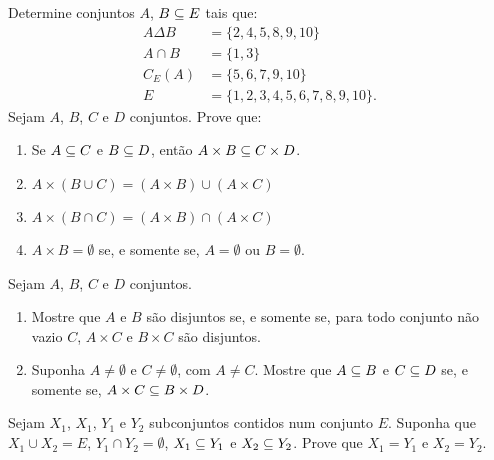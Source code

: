 \documentclass[12pt]{exam}
\begin{document}
\questao{} Determine conjuntos $A$, $B \subseteq E$ tais que:
\begin{align*}
	A \Delta B &= \{2, 4, 5, 8, 9, 10\}\\
	A \cap B &= \{1, 3\}\\
	C_E(A) &= \{5, 6, 7, 9, 10\}\\
	E &= \{1, 2, 3, 4, 5, 6, 7, 8, 9, 10\}.
\end{align*}
\questao{} Sejam $A$, $B$, $C$ e $D$ conjuntos. Prove que:
\begin{enumerate}[label={\alph*})]
	\item Se $A \subseteq C$ e $B \subseteq D$, ent\~ao $A \times B \subseteq C \times D$.
	\item $A \times (B \cup C) = (A \times B) \cup (A \times C)$
	\item $A \times (B \cap C) = (A \times B) \cap (A \times C)$
	\item $A \times B = \emptyset$ se, e somente se, $A = \emptyset$ ou $B = \emptyset$.
\end{enumerate}

\questao{} Sejam $A$, $B$, $C$ e $D$ conjuntos.
\begin{enumerate}[label={\alph*})]
	\item Mostre que $A$ e $B$ s\~ao disjuntos se, e somente se, para todo conjunto n\~ao vazio $C$, $A \times C$ e $B \times C$ s\~ao disjuntos.
	\item Suponha $A \ne \emptyset$ e $C \ne \emptyset$, com $A \ne C$. Mostre que $A \subseteq B$ e $C \subseteq D$ se, e somente se, $A \times C \subseteq B \times D$.
\end{enumerate}

\vspace{.3cm}

\questao{} Sejam $X_1$, $X_1$, $Y_1$ e $Y_2$ subconjuntos contidos num conjunto $E$. Suponha que $X_1 \cup X_2 = E$, $Y_1 \cap Y_2 = \emptyset$, $X_1 \subseteq Y_1$ e $X_2 \subseteq Y_2$. Prove que $X_1 = Y_1$ e $X_2 = Y_2$.
\end{document}
